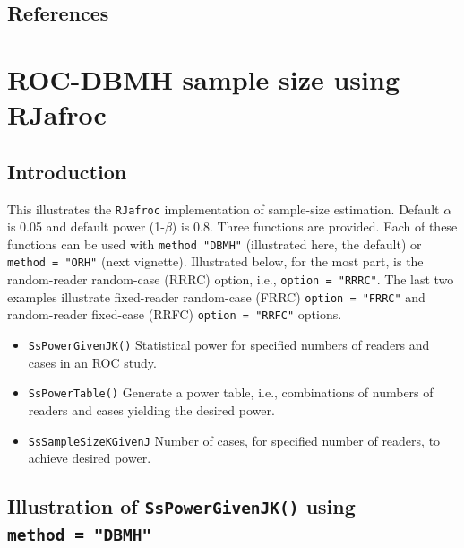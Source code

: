 \documentclass[]{book}
\providecommand{\tightlist}{%
  \setlength{\itemsep}{0pt}\setlength{\parskip}{0pt}}
\begin{document}
\hypertarget{references-7}{%
\section{References}\label{references-7}}

\hypertarget{SSRocDBMHRJafroc}{%
\chapter{ROC-DBMH sample size using RJafroc}\label{SSRocDBMHRJafroc}}

\hypertarget{introduction-8}{%
\section{Introduction}\label{introduction-8}}

This illustrates the \texttt{RJafroc} implementation of sample-size estimation. Default \(\alpha\) is 0.05 and default power (1-\(\beta\)) is 0.8. Three functions are provided. Each of these functions can be used with \texttt{method\ "DBMH"} (illustrated here, the default) or \texttt{method\ =\ "ORH"} (next vignette). Illustrated below, for the most part, is the random-reader random-case (RRRC) option, i.e., \texttt{option\ =\ "RRRC"}. The last two examples illustrate fixed-reader random-case (FRRC) \texttt{option\ =\ "FRRC"} and random-reader fixed-case (RRFC) \texttt{option\ =\ "RRFC"} options.

\begin{itemize}
\tightlist
\item
  \texttt{SsPowerGivenJK()}
  Statistical power for specified numbers of readers and cases in an ROC study.
\item
  \texttt{SsPowerTable()}
  Generate a power table, i.e., combinations of numbers of readers and cases yielding the desired power.
\item
  \texttt{SsSampleSizeKGivenJ}
  Number of cases, for specified number of readers, to achieve desired power.
\end{itemize}

\hypertarget{illustration-of-sspowergivenjk-using-method-dbmh}{%
\section{\texorpdfstring{Illustration of \texttt{SsPowerGivenJK()} using \texttt{method\ =\ "DBMH"}}{Illustration of SsPowerGivenJK() using method = "DBMH"}}\label{illustration-of-sspowergivenjk-using-method-dbmh}}
\end{document}
